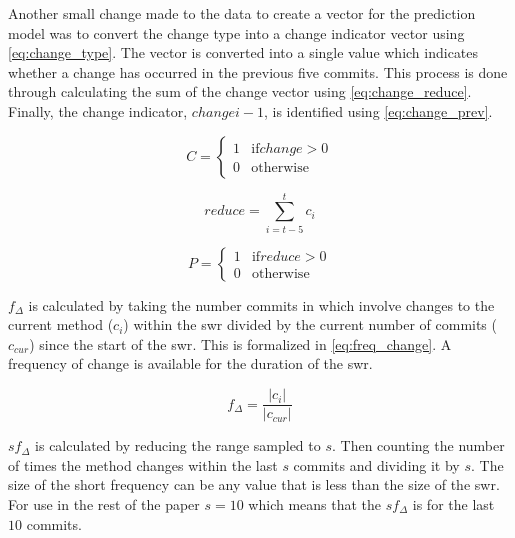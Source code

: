 Another small change made to the data to create a vector for the prediction model was to convert the change type into a change indicator vector using \autoref{eq:change_type}. The vector is converted into a single value which indicates whether a change has occurred in the previous five commits. This process is done through calculating the sum of the change vector using \autoref{eq:change_reduce}. Finally, the change indicator, $change{i-1}$, is identified using \autoref{eq:change_prev}.

\begin{equation} 
\label{eq:change_type}
C = \left\{\begin{matrix}
1 & \text{if} change > 0 \\
0 & \text{otherwise}
\end{matrix}\right.
\end{equation}

\begin{equation} 
\label{eq:change_reduce}
reduce = \sum_{i=t-5}^{t}{c_i}
\end{equation}

\begin{equation} 
\label{eq:change_prev}
P = \left\{\begin{matrix}
1 & \text{if} reduce > 0 \\
0 & \text{otherwise}
\end{matrix}\right.
\end{equation}

$f_{\Delta}$ is calculated by taking the number commits in which involve changes to the current method ($c_i$) within the \gls{swr} divided by the current number of commits ($c_{cur}$) since the start of the \gls{swr}. This is formalized in \autoref{eq:freq_change}. A frequency of change is available for the duration of the \gls{swr}.

\begin{equation}
\label{eq:freq_change}
f_{\Delta} = \frac{|c_i|}{|c_{cur}|}
\end{equation}

$sf_{\Delta}$ is calculated by reducing the range sampled to $s$. Then counting the number of times the method changes within the last $s$ commits and dividing it by $s$. The size of the short frequency can be any value that is less than the size of the \gls{swr}. For use in the rest of the paper $s = 10$ which means that the $sf_{\Delta}$ is for the last $10$ commits.


